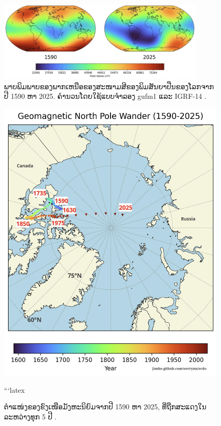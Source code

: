 \documentclass[10pt,twocolumn,letterpaper]{article}
\begin{document}
\begin{figure}[t]
\begin{center}
\includegraphics[width=0.9\textwidth]{saa.jpg}
\end{center}
   \caption{ພາບພິມພາບຂອງພາກເຫນືອຂອງສະໜາມສີຂອງພິມສັນຍາປືນຂອງໂລກຈາກປີ 1590 ຫາ 2025. ຄຳນວນໂດຍໃຊ້ແບບຈຳລອງ gufm1 ແລະ IGRF-14 \cite{125,126}.}
\label{fig:14}
\end{figure}

\begin{figure}[t]
\begin{center}
   \includegraphics[width=1\linewidth]{npw.jpg}
\end{center}

```latex
   \caption{ຕຳແໜ່ງຂອງຂົງເໜືອມັງຫະນິຍົມຈາກປີ 1590 ຫາ 2025, ທີ່ຖືກສະແດງໃນລະຫວ່າງທຸກ 5 ປີ \cite{142}.}
\label{fig:13}
\label{fig:onecol}
\end{figure}
\end{document}
